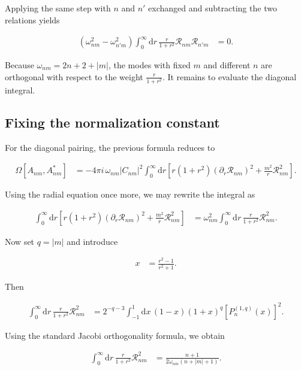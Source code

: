 Applying the same step with $n$ and $n'$ exchanged and subtracting the two relations yields

\begin{align}
(\omega_{nm}^{2}-\omega_{n'm}^{2})\int_{0}^{\infty}\mathrm{d}r\,\frac{r}{1+r^{2}}\mathcal{R}_{nm}\mathcal{R}_{n'm}&=0.
\end{align}

Because $\omega_{nm}=2n+2+|m|$, the modes with fixed $m$ and different $n$ are orthogonal with respect to the weight $\frac{r}{1+r^{2}}$. It remains to evaluate the diagonal integral.

\subsection{Fixing the normalization constant}\label{app:fixing-normalization-constant}

For the diagonal pairing, the previous formula reduces to

\begin{align}
\Omega[A_{nm},A_{nm}^{*}]&=-4\pi i\,\omega_{nm}|C_{nm}|^{2}\int_{0}^{\infty}\mathrm{d}r\left[r(1+r^{2})(\partial_{r}\mathcal{R}_{nm})^{2}+\frac{m^{2}}{r}\mathcal{R}_{nm}^{2}\right].
\end{align}

Using the radial equation once more, we may rewrite the integral as

\begin{align}
\int_{0}^{\infty}\mathrm{d}r\left[r(1+r^{2})(\partial_{r}\mathcal{R}_{nm})^{2}+\frac{m^{2}}{r}\mathcal{R}_{nm}^{2}\right]&=\omega_{nm}^{2}\int_{0}^{\infty}\mathrm{d}r\,\frac{r}{1+r^{2}}\mathcal{R}_{nm}^{2}.
\end{align}

Now set $q=|m|$ and introduce

\begin{align}
x&=\frac{r^{2}-1}{r^{2}+1}.
\end{align}

Then

\begin{align}
\int_{0}^{\infty}\mathrm{d}r\,\frac{r}{1+r^{2}}\mathcal{R}_{nm}^{2}&=2^{-q-3}\int_{-1}^{1}\mathrm{d}x\,(1-x)(1+x)^{q}\left[P_{n}^{(1,q)}(x)\right]^{2}.
\end{align}

Using the standard Jacobi orthogonality formula, we obtain

\begin{align}
\int_{0}^{\infty}\mathrm{d}r\,\frac{r}{1+r^{2}}\mathcal{R}_{nm}^{2}&=\frac{n+1}{2\omega_{nm}(n+|m|+1)}.
\end{align}

